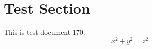 \documentclass{article}
\begin{document}
\section{Test Section}
This is test document 170.
\begin{equation}
x^2 + y^2 = z^2
\end{equation}
\end{document}
